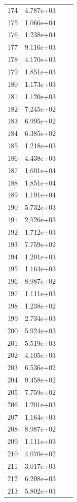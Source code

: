 \documentclass[12pt]{article}
\begin{document}
\begin{longtable}{@{}cccc@{}}
174 & 4.787e+03 &  &  \\
175 & 1.066e+04 &  &  \\
176 & 1.238e+04 &  &  \\
177 & 9.116e+03 &  &  \\
178 & 4.170e+03 &  &  \\
179 & 1.851e+03 &  &  \\
180 & 1.173e+03 &  &  \\
181 & 1.120e+03 &  &  \\
182 & 7.245e+02 &  &  \\
183 & 6.995e+02 &  &  \\
184 & 6.385e+02 &  &  \\
185 & 1.218e+03 &  &  \\
186 & 4.438e+03 &  &  \\
187 & 1.601e+04 &  &  \\
188 & 1.851e+04 &  &  \\
189 & 1.191e+04 &  &  \\
190 & 5.732e+03 &  &  \\
191 & 2.526e+03 &  &  \\
192 & 1.712e+03 &  &  \\
193 & 7.759e+02 &  &  \\
194 & 1.201e+03 &  &  \\
195 & 1.164e+03 &  &  \\
196 & 8.987e+02 &  &  \\
197 & 1.111e+03 &  &  \\
198 & 1.238e+02 &  &  \\
199 & 2.734e+03 &  &  \\
200 & 5.924e+03 &  &  \\
201 & 5.519e+03 &  &  \\
202 & 4.105e+03 &  &  \\
203 & 6.536e+02 &  &  \\
204 & 9.458e+02 &  &  \\
205 & 7.759e+02 &  &  \\
206 & 1.201e+03 &  &  \\
207 & 1.164e+03 &  &  \\
208 & 8.987e+02 &  &  \\
209 & 1.111e+03 &  &  \\
210 & 4.070e+02 &  &  \\
211 & 3.017e+03 &  &  \\
212 & 6.208e+03 &  &  \\
213 & 5.802e+03 &  &  \\

\end{longtable}
\end{document}
